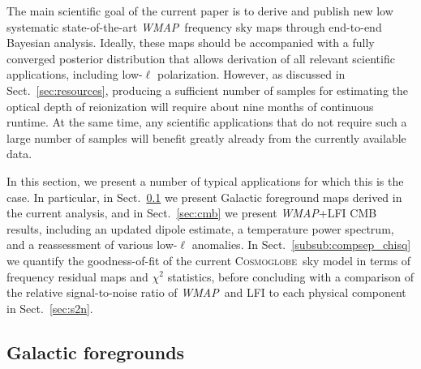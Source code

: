 \documentclass[twocolumn]{../../common/aa}
\def\WMAP{\emph{WMAP}}
\newcommand{\cosmoglobe}{\textsc{Cosmoglobe}}
\begin{document}
The main scientific goal of the current paper is to derive and publish new low systematic state-of-the-art \WMAP\ frequency sky maps through end-to-end Bayesian analysis. Ideally, these maps should be accompanied with a fully converged posterior distribution that allows derivation of all relevant scientific applications, including low-$\ell$ polarization. However, as discussed in Sect.~\ref{sec:resources}, producing a sufficient number of samples for estimating the optical depth of reionization will require about nine months of continuous runtime. At the same time, any scientific applications that do not require such a large number of samples will benefit greatly already from the currently available data.

In this section, we present a number of typical applications for which this is the case. In particular, in Sect.~\ref{subsec:foregrounds} we present Galactic foreground maps derived in the current analysis, and in Sect.~\ref{sec:cmb} we present \WMAP+LFI CMB results, including an updated dipole estimate, a temperature power spectrum, and a reassessment of various low-$\ell$ anomalies. In Sect.~\ref{subsub:compsep_chisq} we quantify the goodness-of-fit of the current \cosmoglobe\ sky model in terms of frequency residual maps and $\chi^2$ statistics, before concluding with a comparison of the relative signal-to-noise ratio of \WMAP\ and LFI to each physical component in Sect.~\ref{sec:s2n}. 


\subsection{Galactic foregrounds}\label{subsec:foregrounds}
\end{document}
